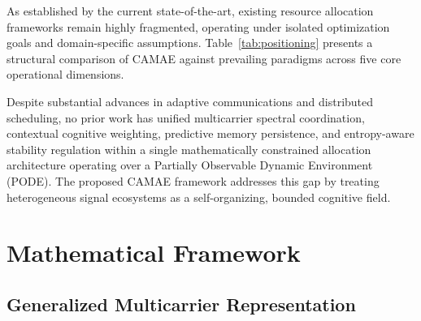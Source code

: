 \documentclass[journal,10pt,twocolumn,twoside]{IEEEtran}
\begin{document}
As established by the current state-of-the-art, existing resource allocation frameworks remain highly fragmented, operating under isolated optimization goals and domain-specific assumptions. Table~\ref{tab:positioning} presents a structural comparison of CAMAE against prevailing paradigms across five core operational dimensions.

\begin{table}[t]
\caption{Structural Framework Positioning Matrix}
\label{tab:positioning}
\centering
\footnotesize
{}
\end{table}

Despite substantial advances in adaptive communications and distributed scheduling, no prior work has unified multicarrier spectral coordination, contextual cognitive weighting, predictive memory persistence, and entropy-aware stability regulation within a single mathematically constrained allocation architecture operating over a Partially Observable Dynamic Environment (PODE). The proposed CAMAE framework addresses this gap by treating heterogeneous signal ecosystems as a self-organizing, bounded cognitive field.

\section{Mathematical Framework}
\label{sec:framework}

\subsection{Generalized Multicarrier Representation}
\end{document}
